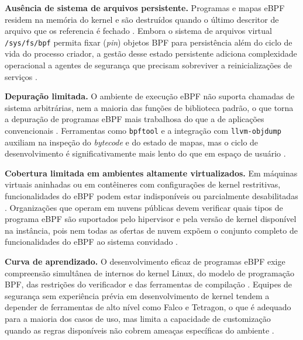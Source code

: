 \textbf{Ausência de sistema de arquivos persistente.}
Programas e mapas eBPF residem na memória do kernel e são destruídos quando o
último descritor de arquivo que os referencia é fechado \cite{linuxkernel2024}.
Embora o sistema de arquivos virtual \texttt{/sys/fs/bpf} permita fixar
(\textit{pin}) objetos BPF para persistência além do ciclo de vida do processo
criador, a gestão desse estado persistente adiciona complexidade operacional a
agentes de segurança que precisam sobreviver a reinicializações de serviços
\cite{gregg2020}.

\textbf{Depuração limitada.}
O ambiente de execução eBPF não suporta chamadas de sistema arbitrárias, nem
a maioria das funções de biblioteca padrão, o que torna a depuração de programas
eBPF mais trabalhosa do que a de aplicações convencionais \cite{gregg2019}.
Ferramentas como \texttt{bpftool} e a integração com \texttt{llvm-objdump}
auxiliam na inspeção do \textit{bytecode} e do estado de mapas, mas o ciclo de
desenvolvimento é significativamente mais lento do que em espaço de usuário
\cite{bcc}.

\textbf{Cobertura limitada em ambientes altamente virtualizados.}
Em máquinas virtuais aninhadas ou em contêineres com configurações de kernel
restritivas, funcionalidades do eBPF podem estar indisponíveis ou parcialmente
desabilitadas \cite{linuxkernel2024}.
Organizações que operam em nuvens públicas devem verificar quais tipos de
programa eBPF são suportados pelo hipervisor e pela versão de kernel disponível
na instância, pois nem todas as ofertas de nuvem expõem o conjunto completo de
funcionalidades do eBPF ao sistema convidado \cite{gregg2020}.

\textbf{Curva de aprendizado.}
O desenvolvimento eficaz de programas eBPF exige compreensão simultânea de
internos do kernel Linux, do modelo de programação BPF, das restrições do
verificador e das ferramentas de compilação \cite{gregg2019}.
Equipes de segurança sem experiência prévia em desenvolvimento de kernel tendem
a depender de ferramentas de alto nível como Falco e Tetragon, o que é adequado
para a maioria dos casos de uso, mas limita a capacidade de customização quando
as regras disponíveis não cobrem ameaças específicas do ambiente \cite{majors2022}.